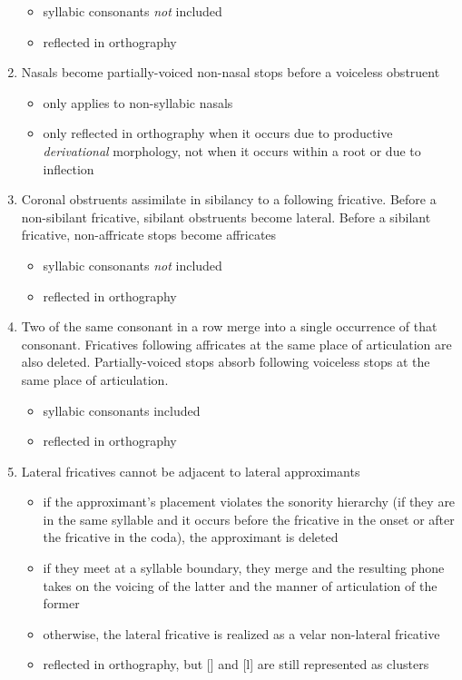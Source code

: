 \documentclass[a4paper,11pt,oneside,openany]{memoir}
\newcommand{\bripa}[1]{[#1]}
\begin{document}
\begin{enumerate}
    \begin{itemize}
        \item syllabic consonants \emph{not} included
        \item reflected in orthography
    \end{itemize}
    \item Nasals become partially-voiced non-nasal stops before a voiceless obstruent
    \begin{itemize}
        \item only applies to non-syllabic nasals
        \item only reflected in orthography when it occurs due to productive \emph{derivational} morphology, not when it occurs within a root or due to inflection
    \end{itemize}
    \item Coronal obstruents assimilate in sibilancy to a following fricative. Before a non-sibilant fricative, sibilant obstruents become lateral. Before a sibilant fricative, non-affricate stops become affricates
    \begin{itemize}
        \item syllabic consonants \emph{not} included
        \item reflected in orthography
    \end{itemize}
    \item Two of the same consonant in a row merge into a single occurrence of that consonant. Fricatives following affricates at the same place of articulation are also deleted. Partially-voiced stops absorb following voiceless stops at the same place of articulation.
    \begin{itemize}
        \item syllabic consonants included
        \item reflected in orthography
    \end{itemize}
    \item Lateral fricatives cannot be adjacent to lateral approximants
    \begin{itemize}
        \item if the approximant's placement violates the sonority hierarchy (if they are in the same syllable and it occurs before the fricative in the onset or after the fricative in the coda), the approximant is deleted
        \item if they meet at a syllable boundary, they merge and the resulting phone takes on the voicing of the latter and the manner of articulation of the former
        \item otherwise, the lateral fricative is realized as a velar non-lateral fricative
        \item reflected in orthography, but \bripa{\latfrivoic} and \bripa{l\vless} are still represented as clusters
    \end{itemize}
\end{enumerate}
\end{document}
